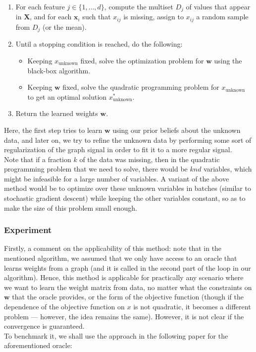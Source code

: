 \documentclass[a4paper]{article}
\newcommand{\nl}{\vspace{0.2cm}\\}
\newcommand{\mf}{\mathbf}
\begin{document}
\begin{enumerate}
    \item For each feature $j \in \{1, \ldots, d\}$, compute the multiset $D_j$ of values that appear in $\mf{X}$, and for each $\mf{x}_i$ such that $x_{ij}$ is missing, assign
        to $x_{ij}$ a random sample from $D_j$ (or the mean).
    \item Until a stopping condition is reached, do the following:
        \begin{itemize}
            \item Keeping $x_{\text{unknown}}$ fixed, solve the optimization problem for $\mf{w}$ using the black-box algorithm.
            \item Keeping $\mf{w}$ fixed, solve the quadratic programming problem for $x_{\text{unknown}}$ to get an optimal solution $x^*_{\text{unknown}}$.
        \end{itemize}
    \item Return the learned weights $\mf{w}$.
\end{enumerate}

Here, the first step tries to learn $\mf{w}$ using our prior beliefs about the unknown data, and later on, we try to refine the unknown data by performing some sort of regularization of the
graph signal in order to fit it to a more regular signal.\nl

Note that if a fraction $k$ of the data was missing, then in the quadratic programming problem that we need to solve, there would be $knd$ variables, which might be infeasible for a
large number of variables. A variant of the above method would be to optimize over these unknown variables in batches (similar to stochastic gradient descent) while keeping the other variables
constant, so as to make the size of this problem small enough.

\subsubsection{Experiment}
Firstly, a comment on the applicability of this method: note that in the mentioned algorithm, we assumed that we only have access to an oracle that learns weights from a graph (and it is called in
the second part of the loop in our algorithm). Hence, this method is applicable for practically any scenario where we want to learn the weight matrix from data, no matter what the constraints
on $\mf{w}$ that the oracle provides, or the form of the objective function (though if the dependence of the objective function on $x$ is not quadratic, it becomes a different problem ---
however, the idea remains the same). However, it is not clear if the convergence is guaranteed.\nl
To benchmark it, we shall use the approach in the following paper for the aforementioned oracle:
\end{document}
